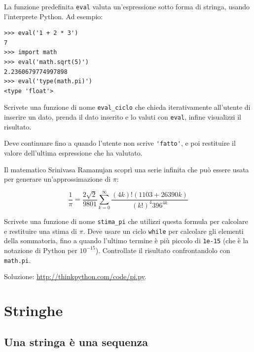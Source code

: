 \documentclass[10pt]{book}
\begin{document}
\vspace{0.2in}
\begin{exercise}

La funzione predefinita {\tt eval} valuta un'espressione sotto forma di stringa, usando l'interprete Python. Ad esempio:

\begin{verbatim}
>>> eval('1 + 2 * 3')
7
>>> import math
>>> eval('math.sqrt(5)')
2.2360679774997898
>>> eval('type(math.pi)')
<type 'float'>
\end{verbatim}
%
Scrivete una funzione di nome \verb"eval_ciclo" che chieda iterativamente all'utente di inserire un dato, prenda il dato inserito e lo valuti con {\tt eval}, infine visualizzi il risultato.

Deve continuare fino a quando l'utente non scrive \verb"'fatto'", e poi restituire il valore dell'ultima espressione che ha valutato.

\end{exercise}

\vspace{0.2in}
\begin{exercise}

Il matematico Srinivasa Ramanujan scoprì una serie infinita che può essere usata per generare un'approssimazione di $\pi$:

\[ \frac{1}{\pi} = \frac{2\sqrt{2}}{9801} 
\sum^\infty_{k=0} \frac{(4k)!(1103+26390k)}{(k!)^4 396^{4k}} \]

Scrivete una funzione di nome \verb"stima_pi" che utilizzi questa formula per calcolare e restituire una stima di $\pi$.  Deve usare un ciclo {\tt while}
per calcolare gli elementi della sommatoria, fino a quando l'ultimo termine è più piccolo di {\tt 1e-15} (che è la notazione di Python per $10^{-15}$).
Controllate il risultato confrontandolo con {\tt math.pi}.

Soluzione: \url{http://thinkpython.com/code/pi.py}.

\end{exercise}


\chapter{Stringhe}
\label{strings}


\section{Una stringa è una sequenza}
\end{document}
